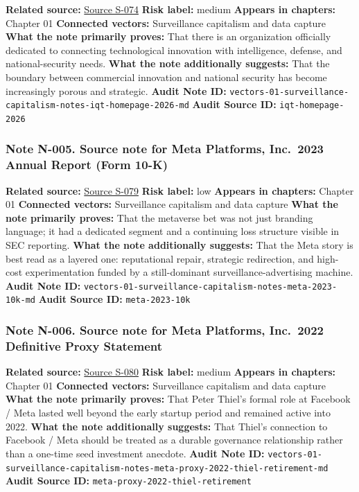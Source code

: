 \documentclass[
  american,
  11pt,
  letterpaper,
]{article}
\begin{document}
\textbf{Related source:} \hyperref[source-s-074-in-q-tel]{Source S-074}
\textbf{Risk label:} medium \textbf{Appears in chapters:} Chapter 01
\textbf{Connected vectors:} Surveillance capitalism and data capture
\textbf{What the note primarily proves:} That there is an organization
officially dedicated to connecting technological innovation with
intelligence, defense, and national-security needs. \textbf{What the
note additionally suggests:} That the boundary between commercial
innovation and national security has become increasingly porous and
strategic. \textbf{Audit Note ID:}
\texttt{vectors-01-surveillance-capitalism-notes-iqt-homepage-2026-md}
\textbf{Audit Source ID:} \texttt{iqt-homepage-2026}

\subsubsection{Note N-005. Source note for Meta Platforms, Inc.~2023
Annual Report (Form
10-K)}\label{note-n-005-vectors-01-surveillance-capitalism-notes-meta-2023-10k-md}

\textbf{Related source:}
\hyperref[source-s-079-meta-platforms-inc-2023-annual-report-form-10-k]{Source
S-079} \textbf{Risk label:} low \textbf{Appears in chapters:} Chapter 01
\textbf{Connected vectors:} Surveillance capitalism and data capture
\textbf{What the note primarily proves:} That the metaverse bet was not
just branding language; it had a dedicated segment and a continuing loss
structure visible in SEC reporting. \textbf{What the note additionally
suggests:} That the Meta story is best read as a layered one:
reputational repair, strategic redirection, and high-cost
experimentation funded by a still-dominant surveillance-advertising
machine. \textbf{Audit Note ID:}
\texttt{vectors-01-surveillance-capitalism-notes-meta-2023-10k-md}
\textbf{Audit Source ID:} \texttt{meta-2023-10k}

\subsubsection{Note N-006. Source note for Meta Platforms, Inc.~2022
Definitive Proxy
Statement}\label{note-n-006-vectors-01-surveillance-capitalism-notes-meta-proxy-2022-thiel-retirement-md}

\textbf{Related source:}
\hyperref[source-s-080-meta-platforms-inc-2022-definitive-proxy-statement]{Source
S-080} \textbf{Risk label:} medium \textbf{Appears in chapters:} Chapter
01 \textbf{Connected vectors:} Surveillance capitalism and data capture
\textbf{What the note primarily proves:} That Peter Thiel's formal role
at Facebook / Meta lasted well beyond the early startup period and
remained active into 2022. \textbf{What the note additionally suggests:}
That Thiel's connection to Facebook / Meta should be treated as a
durable governance relationship rather than a one-time seed investment
anecdote. \textbf{Audit Note ID:}
\texttt{vectors-01-surveillance-capitalism-notes-meta-proxy-2022-thiel-retirement-md}
\textbf{Audit Source ID:} \texttt{meta-proxy-2022-thiel-retirement}
\end{document}
